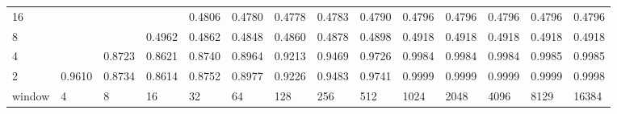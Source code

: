 \begin{table}[h]
{\begin{tabular}{lrrrrrrrrrrrrr}
			\multicolumn{1}{|l|}{16} &  &  &  & \cellcolor[HTML]{99E600}0.4806 & \cellcolor[HTML]{99E600}0.4780 & \cellcolor[HTML]{99E600}0.4778 & \cellcolor[HTML]{99E600}0.4783 & \cellcolor[HTML]{99E600}0.4790 & \cellcolor[HTML]{99E600}0.4796 & \cellcolor[HTML]{99E600}0.4796 & \cellcolor[HTML]{99E600}0.4796 & \cellcolor[HTML]{99E600}0.4796 & \cellcolor[HTML]{99E600}0.4796 \\ \cline{1-1}
			\multicolumn{1}{|l|}{8} &  &  & \cellcolor[HTML]{99E600}0.4962 & \cellcolor[HTML]{99E600}0.4862 & \cellcolor[HTML]{99E600}0.4848 & \cellcolor[HTML]{99E600}0.4860 & \cellcolor[HTML]{99E600}0.4878 & \cellcolor[HTML]{99E600}0.4898 & \cellcolor[HTML]{99E600}0.4918 & \cellcolor[HTML]{99E600}0.4918 & \cellcolor[HTML]{99E600}0.4918 & \cellcolor[HTML]{99E600}0.4918 & \cellcolor[HTML]{99E600}0.4918 \\ \cline{1-1}
			\multicolumn{1}{|l|}{4} &  & \cellcolor[HTML]{9900E6}0.8723 & \cellcolor[HTML]{9900E6}0.8621 & \cellcolor[HTML]{9900E6}0.8740 & \cellcolor[HTML]{4C00E6}0.8964 & \cellcolor[HTML]{4C00E6}0.9213 & \cellcolor[HTML]{4C00E6}0.9469 & \cellcolor[HTML]{4C00E6}0.9726 & \cellcolor[HTML]{4C00E6}0.9984 & \cellcolor[HTML]{4C00E6}0.9984 & \cellcolor[HTML]{4C00E6}0.9984 & \cellcolor[HTML]{4C00E6}0.9985 & \cellcolor[HTML]{4C00E6}0.9985 \\ \cline{1-1}
			\multicolumn{1}{|l|}{2} & \cellcolor[HTML]{4C00E6}0.9610 & \cellcolor[HTML]{9900E6}0.8734 & \cellcolor[HTML]{9900E6}0.8614 & \cellcolor[HTML]{9900E6}0.8752 & \cellcolor[HTML]{4C00E6}0.8977 & \cellcolor[HTML]{4C00E6}0.9226 & \cellcolor[HTML]{4C00E6}0.9483 & \cellcolor[HTML]{4C00E6}0.9741 & \cellcolor[HTML]{4C00E6}0.9999 & \cellcolor[HTML]{4C00E6}0.9999 & \cellcolor[HTML]{4C00E6}0.9999 & \cellcolor[HTML]{4C00E6}0.9999 & \cellcolor[HTML]{4C00E6}0.9998 \\ \cline{1-1}
			\multicolumn{1}{l|}{window} & \multicolumn{1}{l|}{4} & \multicolumn{1}{l|}{8} & \multicolumn{1}{l|}{16} & \multicolumn{1}{l|}{32} & \multicolumn{1}{l|}{64} & \multicolumn{1}{l|}{128} & \multicolumn{1}{l|}{256} & \multicolumn{1}{l|}{512} & \multicolumn{1}{l|}{1024} & \multicolumn{1}{l|}{2048} & \multicolumn{1}{l|}{4096} & \multicolumn{1}{l|}{8129} & \multicolumn{1}{l|}{16384} \\ \cline{2-14}
		\end{tabular}
	}
\end{table}




